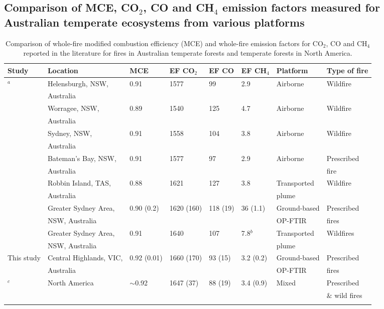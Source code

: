 \documentclass[acp, manuscript]{copernicus}
\begin{document}
\subsection{Comparison of MCE, CO$_2$, CO and CH$_4$ emission factors measured for Australian temperate ecosystems from various platforms}


\begin{table}
 \caption{Comparison of whole-fire modified combustion efficiency (MCE) and whole-fire emission factors for CO$_2$, CO and CH$_4$ reported in the literature for fires in Australian temperate forests and temperate forests in North America.}
 \begin{tabular}{l l l l l l l l } 
   \tophline
   Study & Location & MCE & EF CO$_2$ & EF CO & EF CH$_4$ & Platform & Type of fire \\ 
   \hline
   \citet{Hurst1996}$^a$ & Helensburgh, NSW, & 0.91 & 1577 & 99&2.9 & Airborne & Wildfire\\
   &Australia &&&&&&\\ 
   & Worragee, NSW,& 0.89 & 1540 & 125 & 4.7 & Airborne & Wildfire \\
   &Australia &&&&&&\\ 
   & Sydney, NSW, & 0.91 & 1558 & 104 & 3.8 & Airborne & Wildfire \\
   & Australia &&&&&&\\ 
   & Bateman's Bay, NSW,& 0.91 & 1577 & 97 &2.9 & Airborne & Prescribed  \\
   & Australia &&&&&& fire\\ 
  \citet{Lawson2015} & Robbin Island, TAS, & 0.88 & 1621 & 127 &3.8 & Transported  & Wildfire \\
  & Australia & & & & & plume & \\
  \citet{Paton-Walsh2014} & Greater Sydney Area, & 0.90 (0.2) & 1620 (160) & 118 (19) & 36 (1.1) & Ground-based  & Prescribed \\
      &  NSW, Australia& & & & & OP-FTIR& fires \\
   \citet{Rea2016} & Greater Sydney Area, & 0.91 & 1640& 107& 7.8$^b$& Transported  & Wildfires \\
     & NSW, Australia& & & & & plume& \\   
   This study & Central Highlands, VIC, & 0.92 (0.01) & 1660 (170) & 93 (15) & 3.2 (0.2) & Ground-based & Prescribed  \\
     &Australia & & & & & OP-FTIR & fires\\
   \citet{Akagi2011}$^c$ & North America & $\sim$0.92 & 1647 (37) & 88 (19) & 3.4 (0.9) & Mixed & Prescribed \\ 
  & & & & & & &  $\&$ wild fires \\ 
 \bottomhline
 \end{tabular}
\end{table}
\end{document}
